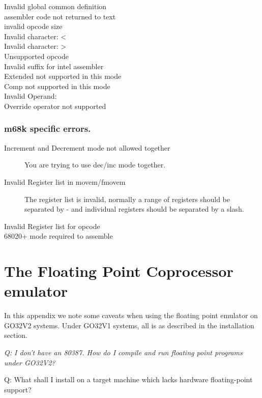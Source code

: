 \documentclass{report}
\begin{document}
\begin{description}
\item [ Invalid global common definition ]
\item [ assembler code not returned to text ]
\item [ invalid opcode size ]
\item [ Invalid character: < ]
\item [ Invalid character: > ]
\item [ Unsupported opcode ]
\item [ Invalid suffix for intel assembler ]
\item [ Extended not supported in this mode ]
\item [ Comp not supported in this mode ]
\item [ Invalid Operand: ]
\item [ Override operator not supported ]
\end{description}

\subsection{m68k specific errors.}
\begin{description}
\item [Increment and Decrement mode not allowed together]
You are trying to use dec/inc mode together.

\item [Invalid Register list in movem/fmovem]
The register list is invalid, normally a range of registers should
be separated by - and individual registers should be separated by
a slash.
\item [Invalid Register list for opcode]
\item [68020+ mode required to assemble]
\end{description}


\chapter{The Floating Point Coprocessor emulator}

In this appendix we note some caveats when using the floating point 
emulator on GO32V2 systems. Under GO32V1 systems, all is as described in
the installation section.

{\em Q: I don't have an 80387. How do I compile and run floating point
   programs under GO32V2?

     Q: What shall I install on a target machine which lacks hardware
   floating-point support?
}
\end{document}
